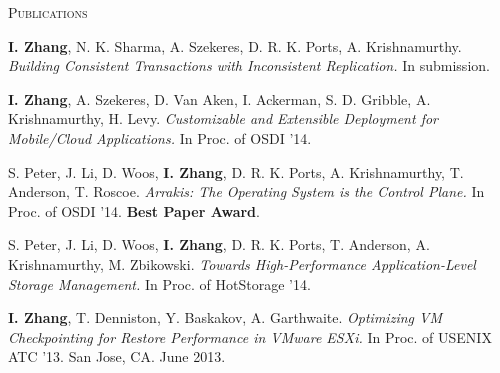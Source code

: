 \documentclass[10pt,times]{report}
\newlength{\sectiongap}
\newlength{\entrygap}
\newlength{\sectioncolwidth}
\newlength{\colgap}
\newlength{\stuffwidth}
\def\ifEqString#1#2{\def\testa{#1}\def\testb{#2}%
  \ifx\testa\testb}
\newenvironment{rtable}{
  \begin{minipage}{\textwidth}
  }{
  \end{minipage}
}
\newenvironment{rentry}[3][xxx]{
  \begin{minipage}[t]{\hsize}
    \textbf{#2}\ifEqString{#1}{xxx}\relax\else, \textit{#1}\fi
    \hspace{\stretch{1}} #3 \\
  }{
    \removelastskip
  \end{minipage}
  \\[\entrygap]  %
}
\newenvironment{rsection}[1]{
  \begin{minipage}[t]{\sectioncolwidth}
    \textsc{#1}
  \end{minipage}
  \hspace{\colgap}
  \begin{minipage}[t]{\stuffwidth}
  }{
    \removelastskip
  \end{minipage}
  \\[\sectiongap]
}
\begin{document}
\begin{rtable}
\vspace{1.0em}
 \begin{rsection}{Publications}
   \textbf{I. Zhang}, N. K. Sharma, A. Szekeres, D. R. K. Ports,
   A. Krishnamurthy. \textit{Building Consistent Transactions with
     Inconsistent Replication.}
   In submission.\\\vspace{-0.5em}

   \textbf{I. Zhang}, A. Szekeres, D. Van Aken, I. Ackerman, S. D. Gribble,
   A. Krishnamurthy, H. Levy. \textit{Customizable and Extensible
     Deployment for Mobile/Cloud Applications.} In Proc. of OSDI '14.\\\vspace{-0.5em}

   S. Peter, J. Li, D. Woos, \textbf{I. Zhang}, D. R. K. Ports, A. Krishnamurthy,
   T. Anderson, T. Roscoe. \textit{Arrakis: The Operating System is
     the Control Plane.} In Proc. of OSDI '14. \textbf{Best Paper Award}.\\\vspace{-0.5em}

   S. Peter, J. Li, D. Woos, \textbf{I. Zhang}, D. R. K. Ports, T. Anderson,
   A. Krishnamurthy, M. Zbikowski. \textit{Towards High-Performance
     Application-Level Storage Management.} In Proc. of HotStorage
   '14. \\\vspace{-0.5em}

    \textbf{I. Zhang}, T. Denniston, Y. Baskakov, A. Garthwaite. \textit{Optimizing
      VM Checkpointing for Restore Performance in VMware ESXi.} In
    Proc. of USENIX ATC '13. San Jose, CA. June 2013.\\\vspace{-0.5em}


\end{rsection}
\end{rtable}
\end{document}

